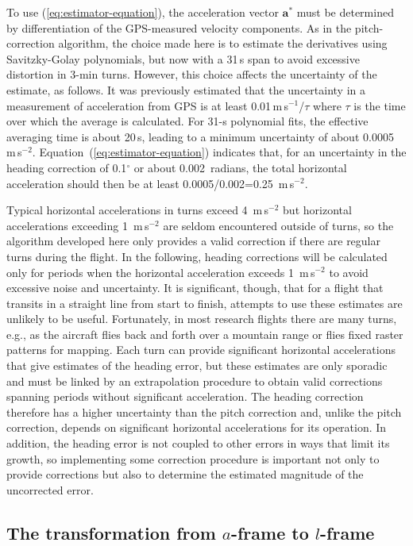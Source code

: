 \documentclass[english,british,amt,bookmarks=false,unicode=true]{copernicus}\usepackage[]{graphicx}\usepackage[]{color}
\begin{document}
To use (\ref{eq:estimator-equation}), the acceleration vector $\mathbf{a^{*}}$
must be determined by differentiation of the GPS-measured velocity
components. As in the pitch-correction algorithm, the choice made
here is to estimate the derivatives using Savitzky-Golay polynomials,
but now with a 31\,s span to avoid excessive distortion in 3-min
turns. However, this choice affects the uncertainty of the estimate,
as follows. It was previously estimated that the uncertainty in a
measurement of acceleration from GPS is at least 0.01\,m\,s$^{-1}$/$\tau$
where $\tau$ is the time over which the average is calculated. For
31-s polynomial fits, the effective averaging time is about 20\,s,
leading to a minimum uncertainty of about 0.0005\,m\,s$^{-2}$.
Equation~(\ref{eq:estimator-equation}) indicates that, for an uncertainty
in the heading correction of 0.1$^{\circ}$ or about 0.002~radians,
the total horizontal acceleration should then be at least 0.0005/0.002=0.25~m\,s$^{-2}$.

Typical horizontal accelerations in turns exceed 4~m\,s$^{-2}$
but horizontal accelerations exceeding 1~m\,s$^{-2}$ are seldom
encountered outside of turns, so the algorithm developed here only
provides a valid correction if there are regular turns during the
flight. In the following, heading corrections will be calculated only
for periods when the horizontal acceleration exceeds 1~m\,s$^{-2}$
to avoid excessive noise and uncertainty. It is significant, though,
that for a flight that transits in a straight line from start to finish,
attempts to use these estimates are unlikely to be useful. Fortunately,
in most research flights there are many turns, e.g., as the aircraft
flies back and forth over a mountain range or flies fixed raster patterns
for mapping. Each turn can provide significant horizontal accelerations
that give estimates of the heading error, but these estimates are
only sporadic and must be linked by an extrapolation procedure to
obtain valid corrections spanning periods without significant acceleration.
The heading correction therefore has a higher uncertainty than the
pitch correction and, unlike the pitch correction, depends on significant
horizontal accelerations for its operation. In addition, the heading
error is not coupled to other errors in ways that limit its growth,
so implementing some correction procedure is important not only to
provide corrections but also to determine the estimated magnitude
of the uncorrected error.




\subsection{The transformation from $a$-frame to $l$-frame}
\end{document}
